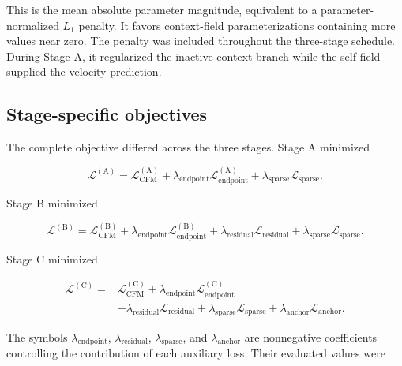 This is the mean absolute parameter magnitude, equivalent to a
parameter-normalized \(L_1\) penalty. It favors context-field parameterizations
containing more values near zero. The penalty was included throughout the
three-stage schedule. During Stage A, it regularized the inactive context
branch while the self field supplied the velocity prediction.

\subsection{Stage-specific objectives}
\label{appb-sec:methods-stage-objectives}

The complete objective differed across the three stages. Stage A minimized

\begin{equation}
\mathcal{L}^{(\mathrm{A})}
=
\mathcal{L}_{\mathrm{CFM}}^{(\mathrm{A})}
+
\lambda_{\mathrm{endpoint}}
\mathcal{L}_{\mathrm{endpoint}}^{(\mathrm{A})}
+
\lambda_{\mathrm{sparse}}
\mathcal{L}_{\mathrm{sparse}}.
\label{appb-eq:methods-stage-a-objective}
\end{equation}

Stage B minimized

\begin{equation}
\mathcal{L}^{(\mathrm{B})}
=
\mathcal{L}_{\mathrm{CFM}}^{(\mathrm{B})}
+
\lambda_{\mathrm{endpoint}}
\mathcal{L}_{\mathrm{endpoint}}^{(\mathrm{B})}
+
\lambda_{\mathrm{residual}}
\mathcal{L}_{\mathrm{residual}}
+
\lambda_{\mathrm{sparse}}
\mathcal{L}_{\mathrm{sparse}}.
\label{appb-eq:methods-stage-b-objective}
\end{equation}

Stage C minimized

\begin{equation}
\begin{aligned}
\mathcal{L}^{(\mathrm{C})}
={}&
\mathcal{L}_{\mathrm{CFM}}^{(\mathrm{C})}
+
\lambda_{\mathrm{endpoint}}
\mathcal{L}_{\mathrm{endpoint}}^{(\mathrm{C})}
\\
&+
\lambda_{\mathrm{residual}}
\mathcal{L}_{\mathrm{residual}}
+
\lambda_{\mathrm{sparse}}
\mathcal{L}_{\mathrm{sparse}}
+
\lambda_{\mathrm{anchor}}
\mathcal{L}_{\mathrm{anchor}}.
\end{aligned}
\label{appb-eq:methods-stage-c-objective}
\end{equation}

The symbols
\(\lambda_{\mathrm{endpoint}}\),
\(\lambda_{\mathrm{residual}}\),
\(\lambda_{\mathrm{sparse}}\), and
\(\lambda_{\mathrm{anchor}}\)
are nonnegative coefficients controlling the contribution of each auxiliary
loss. Their evaluated values were

